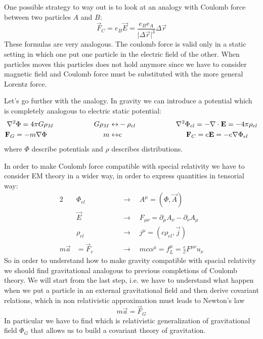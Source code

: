 \documentclass[../main/main.tex]{subfiles}
\begin{document}
One possible strategy to way out is to look at an analogy with Coulomb force between two particles $A$ and $B$:
\[\vec F_C=e_B\vec E=\frac{e_Be_A}{\vert\Delta\vec r\vert^3}\Delta\vec r\]
These formulas are very analogous. The coulomb force is valid only in a static setting in which one put one particle in the electric field of the other. When particles moves this particles does not hold anymore since we have to consider magnetic field and Coulomb force must be substituted with the more general Lorentz force.


Let's go further with the analogy. In gravity we can introduce a potential which is completely analogous to electric static potential:
\begin{align*}
\nabla^2\Phi=4\pi G\rho_M\hspace{2cm}G\rho_M\leftrightarrow&-\rho_{el}\hspace{2cm}\nabla^2\Phi_{el}=-\vect\nabla\cdot\vec E=-4\pi\rho_{el}\\
\vec F_G=-m\vect\nabla\Phi\hspace{2.8cm}m\leftrightarrow&e\hspace{3.2cm}\vec F_C=e\vec E=-e\vect\nabla\Phi_{el}
\end{align*}
where $\Phi$ describe potentials and $\rho$ describes distributions. 

In order to make Coulomb force compatible with special relativity we have to consider EM theory in a wider way, in order to express quantities in tensorial way:
\begin{alignat*}{2}
&\Phi_{el}\hspace{1cm}&&\rightarrow\quad	A^\mu=(\Phi, \vec A)\\
&\vec E\hspace{1cm}&&\rightarrow\quad	F_{\mu\nu}=\partial_\mu A_\nu-\partial_\nu A_\mu\\
&\rho_{el}\hspace{1cm}&&\rightarrow\quad	j^\mu=(c\rho_{el},\vec j)\\
m\vec a&=\vec F_c\hspace{1cm}&&\rightarrow\quad	mc\alpha^\mu=f^\mu_L=\frac ecF^{\mu\nu}u_\nu
\end{alignat*}
So in order to understand how to make gravity compatible with spacial relativity we should find gravitational analogous to previous completions of Coulomb theory. We will start from the last  step, i.e. we have to understand what happen when we put a particle in an external gravitational field and then derive covariant relations, which in non relativistic approximation must leads to Newton's law
\[m\vec a=\vec F_G\]
In particular we have to find which is relativistic generalization of gravitational field $\Phi_G$ that allows us to build a covariant theory of gravitation.
\end{document}
